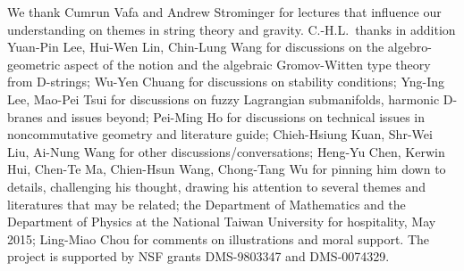 \documentclass[11pt]{article}
\numberwithin{equation}{subsection}
\begin{document}
\begin{titlepage}
\baselineskip 10pt
{\scriptsize
{}
We thank Cumrun Vafa and Andrew Strominger for lectures
  that influence our understanding on themes in string theory and gravity.
C.-H.L.\ thanks in addition
  Yuan-Pin Lee, Hui-Wen Lin, Chin-Lung Wang
     for discussions on the algebro-geometric aspect of the notion
     and the algebraic Gromov-Witten type theory from D-strings;	
  Wu-Yen Chuang
     for discussions on stability conditions; 	
  Yng-Ing Lee, Mao-Pei Tsui
     for discussions on fuzzy Lagrangian submanifolds, harmonic D-branes and issues beyond;
  Pei-Ming Ho
     for discussions on technical issues in noncommutative geometry and literature guide;
  Chieh-Hsiung Kuan, Shr-Wei Liu, Ai-Nung Wang for other discussions/conversations;
  Heng-Yu Chen, Kerwin Hui, Chen-Te Ma, Chien-Hsun Wang, Chong-Tang Wu
     for pinning him down to details, challenging his thought,
	 drawing his attention to several themes and literatures that may be related;   	
 the Department of Mathematics and the Department of Physics at the National Taiwan University
     for hospitality, May 2015;
 Ling-Miao Chou
     for comments on illustrations and moral support.
 The project is supported by NSF grants DMS-9803347 and DMS-0074329.
} %

\end{titlepage}


\newpage
\end{document}
